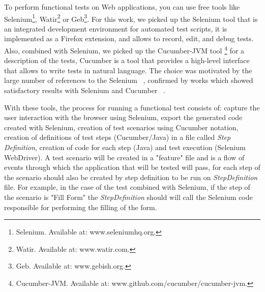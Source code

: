 \documentclass[runningheads,a4paper]{llncs}
\begin{document}
To perform functional tests on Web applications, you can use free tools like Selenium\footnote{Selenium. Available at: www.seleniumhq.org.}, Watir\footnote{Watir. Available at: www.watir.com.} or Geb\footnote{Geb. Available at: www.gebish.org.}. For this work, we picked up the Selenium tool that is an integrated development environment for automated test scripts, it is implemented as a Firefox extension, and allows to record, edit, and debug tests. Also, combined with Selenium, we picked up the Cucumber-JVM tool \footnote{Cucumber-JVM. Available at: www.github.com/cucumber/cucumber-jvm.} for a description of the tests, Cucumber is a tool that provides a high-level interface that allows to write tests in natural language. The choice was motivated by the large number of references to the Selenium ~\cite{testautomationframework, automatingfunctionaltests}, confirmed by works which showed satisfactory results with Selenium and Cucumber ~\cite{cucumberandselenium,sbqs2013}.


With these tools, the process for running a functional test consists of: capture the user interaction with the browser using Selenium, export the generated code created with Selenium, creation of test scenarios using Cucumber notation, creation of definitions of test steps (Cucumber/Java) in a file called \emph{Step Definition}, creation of code for each step (Java) and test execution (Selenium WebDriver). A test scenario will be created in a "feature" file and is a flow of events through which the application that will be tested will pass, for each step of the scenario should also be created by step definition to be run on \emph{StepDefinition} file. For example, in the case of the test combined with Selenium, if the step of the scenario is "Fill Form" the \emph{StepDefinition} should will call the Selenium code responsible for performing the filling of the form.
\end{document}
